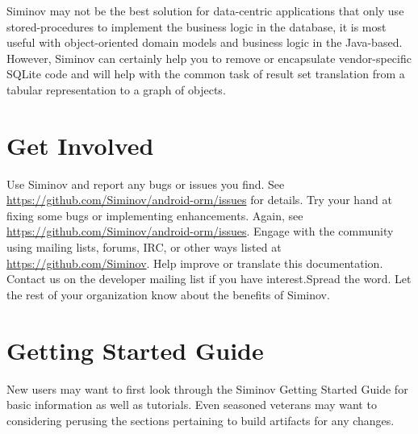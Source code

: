Siminov may not be the best solution for data-centric applications that only use stored-procedures to implement the business logic in the database, it is most useful with object-oriented domain models and business logic in the Java-based. However, Siminov can certainly help you to remove or encapsulate vendor-specific SQLite code and will help with the common task of result set translation from a tabular representation to a graph of objects.


\section{Get Involved}

Use Siminov and report any bugs or issues you find. See \url{https://github.com/Siminov/android-orm/issues} for details. Try your hand at fixing some bugs or implementing enhancements. Again, see \url{https://github.com/Siminov/android-orm/issues}. Engage with the community using mailing lists, forums, IRC, or other ways listed at \url{https://github.com/Siminov}. Help improve or translate this documentation. Contact us on the developer mailing list if you have interest.Spread the word. Let the rest of your organization know about the benefits of Siminov.


\section{Getting Started Guide}

New users may want to first look through the Siminov Getting Started Guide for basic information as well as tutorials. Even seasoned veterans may want to considering perusing the sections pertaining to build artifacts for any changes.
